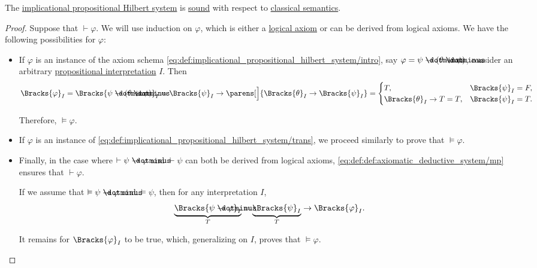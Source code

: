 \begin{proposition}\label{thm:soundness_of_implicational_propositional_deductive_system}
  The \hyperref[def:implicational_propositional_hilbert_system]{implicational propositional Hilbert system} is \hyperref[def:derivability_and_satisfiability/soundness]{sound} with respect to \hyperref[def:propositional_model]{classical semantics}.
\end{proposition}
\begin{proof}
  Suppose that \( \vdash \varphi \). We will use induction on \( \varphi \), which is either a \hyperref[def:axiomatic_deductive_system]{logical axiom} or can be derived from logical axioms. We have the following possibilities for \( \varphi \):
  \begin{itemize}
    \item If \( \varphi \) is an instance of the axiom schema \eqref{eq:def:implicational_propositional_hilbert_system/intro}, say \( \varphi = \psi \synimplies (\theta \synimplies \psi) \), consider an arbitrary \hyperref[def:propositional_valuation]{propositional interpretation} \( I \). Then
    \begin{equation*}
      \Bracks{\varphi}_I
      =
      \Bracks{\psi \synimplies (\theta \synimplies \psi)}_I
      =
      \Bracks{\psi}_I \rightarrow \parens[\Big]{ \Bracks{\theta}_I \rightarrow \Bracks{\psi}_I }
      =
      \begin{cases}
        T,                                            &\Bracks{\psi}_I = F, \\
        \Bracks{\theta}_I \rightarrow T = T, &\Bracks{\psi}_I = T.
      \end{cases}
    \end{equation*}

    Therefore, \( \vDash \varphi \).

    \item If \( \varphi \) is an instance of \eqref{eq:def:implicational_propositional_hilbert_system/trans}, we proceed similarly to prove that \( \vDash \varphi \).

    \item Finally, in the case where \( \vdash \psi \synimplies \varphi \) and \( \vdash \psi \) can both be derived from logical axioms, \ref{eq:def:def:axiomatic_deductive_system/mp} ensures that \( \vdash \varphi \).

    If we assume that \( \vDash \psi \synimplies \varphi \) and \( \vDash \psi \), then for any interpretation \( I \),
    \begin{equation*}
      \underbrace{\Bracks{\psi \synimplies \varphi}_I}_T = \underbrace{\Bracks{\psi}_I}_T \rightarrow \Bracks{\varphi}_I.
    \end{equation*}

    It remains for \( \Bracks{\varphi}_I \) to be true, which, generalizing on \( I \), proves that \( \vDash \varphi \).
  \end{itemize}
\end{proof}

